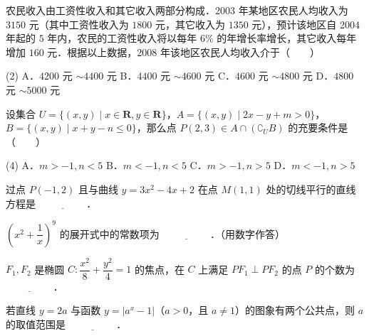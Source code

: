 \begin{question}
农民收入由工资性收入和其它收入两部分构成．2003 年某地区农民人均收入为 $3150$ 元（其中工资性收入为 $1800$ 元，其它收入为 $1350$ 元），预计该地区自 2004 年起的 $5$ 年内，农民的工资性收入将以每年 $6\%$ 的年增长率增长，其它收入每年增加 $160$ 元．根据以上数据，2008 年该地区农民人均收入介于\mbox{（　　）}

\begin{gkopts}(2)
\task A．$4200$ 元 $\sim 4400$ 元
\task B．$4400$ 元 $\sim 4600$ 元
\task C．$4600$ 元 $\sim 4800$ 元
\task D．$4800$ 元 $\sim 5000$ 元
\end{gkopts}

\end{question}
\begin{question}
设集合 $U = \{(x, y) \mid x \in \mathbf{R}, y \in \mathbf{R}\}$，$A = \{(x, y) \mid 2x - y + m > 0\}$，$B = \{(x, y) \mid x + y - n \leqslant 0\}$，那么点 $P(2, 3) \in A \cap (\complement_U B)$ 的充要条件是\mbox{（　　）}

\begin{gkopts}(4)
\task A．$m > -1, n < 5$
\task B．$m < -1, n < 5$
\task C．$m > -1, n > 5$
\task D．$m < -1, n > 5$
\end{gkopts}

\end{question}

\begin{question}
过点 $P(-1, 2)$ 且与曲线 $y = 3x^2 - 4x + 2$ 在点 $M(1, 1)$ 处的切线平行的直线方程是 $\underline{\hspace{2cm}}$．

\end{question}
\begin{question}
$\left(x^2 + \dfrac{1}{x}\right)^9$ 的展开式中的常数项为 $\underline{\hspace{2cm}}$．（用数字作答）

\end{question}
\begin{question}
$F_1, F_2$ 是椭圆 $C: \dfrac{x^2}{8} + \dfrac{y^2}{4} = 1$ 的焦点，在 $C$ 上满足 $PF_1 \perp PF_2$ 的点 $P$ 的个数为 $\underline{\hspace{2cm}}$．

\end{question}
\begin{question}
若直线 $y = 2a$ 与函数 $y = |a^x - 1|$（$a > 0$，且 $a \neq 1$）的图象有两个公共点，则 $a$ 的取值范围是 $\underline{\hspace{2cm}}$．

\end{question}

